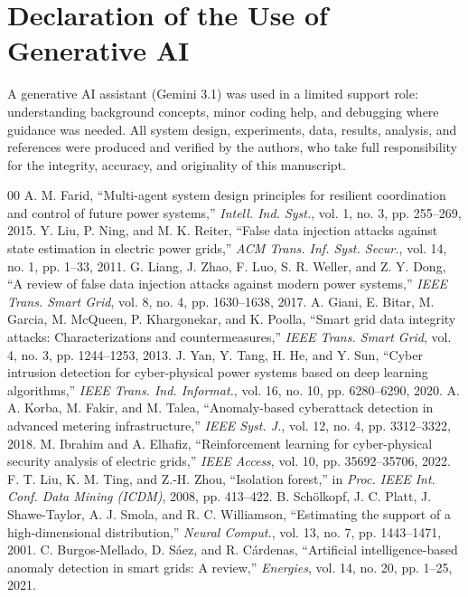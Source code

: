 \documentclass[conference,a4paper]{IEEEtran}
\begin{document}
\section*{Declaration of the Use of Generative AI}
A generative AI assistant (Gemini 3.1) was used in a limited support role: understanding background concepts, minor coding help, and debugging where guidance was needed. All system design, experiments, data, results, analysis, and references were produced and verified by the authors, who take full responsibility for the integrity, accuracy, and originality of this manuscript.

\begin{thebibliography}{00}
 A. M. Farid, ``Multi-agent system design principles for resilient coordination and control of future power systems,'' \textit{Intell. Ind. Syst.}, vol. 1, no. 3, pp. 255--269, 2015.
 Y. Liu, P. Ning, and M. K. Reiter, ``False data injection attacks against state estimation in electric power grids,'' \textit{ACM Trans. Inf. Syst. Secur.}, vol. 14, no. 1, pp. 1--33, 2011.
 G. Liang, J. Zhao, F. Luo, S. R. Weller, and Z. Y. Dong, ``A review of false data injection attacks against modern power systems,'' \textit{IEEE Trans. Smart Grid}, vol. 8, no. 4, pp. 1630--1638, 2017.
 A. Giani, E. Bitar, M. Garcia, M. McQueen, P. Khargonekar, and K. Poolla, ``Smart grid data integrity attacks: Characterizations and countermeasures,'' \textit{IEEE Trans. Smart Grid}, vol. 4, no. 3, pp. 1244--1253, 2013.
 J. Yan, Y. Tang, H. He, and Y. Sun, ``Cyber intrusion detection for cyber-physical power systems based on deep learning algorithms,'' \textit{IEEE Trans. Ind. Informat.}, vol. 16, no. 10, pp. 6280--6290, 2020.
 A. A. Korba, M. Fakir, and M. Talea, ``Anomaly-based cyberattack detection in advanced metering infrastructure,'' \textit{IEEE Syst. J.}, vol. 12, no. 4, pp. 3312--3322, 2018.
 M. Ibrahim and A. Elhafiz, ``Reinforcement learning for cyber-physical security analysis of electric grids,'' \textit{IEEE Access}, vol. 10, pp. 35692--35706, 2022.
 F. T. Liu, K. M. Ting, and Z.-H. Zhou, ``Isolation forest,'' in \textit{Proc. IEEE Int. Conf. Data Mining (ICDM)}, 2008, pp. 413--422.
 B. Sch{\"o}lkopf, J. C. Platt, J. Shawe-Taylor, A. J. Smola, and R. C. Williamson, ``Estimating the support of a high-dimensional distribution,'' \textit{Neural Comput.}, vol. 13, no. 7, pp. 1443--1471, 2001.
 C. Burgos-Mellado, D. S{\'a}ez, and R. C{\'a}rdenas, ``Artificial intelligence-based anomaly detection in smart grids: A review,'' \textit{Energies}, vol. 14, no. 20, pp. 1--25, 2021.

\end{thebibliography}
\end{document}
